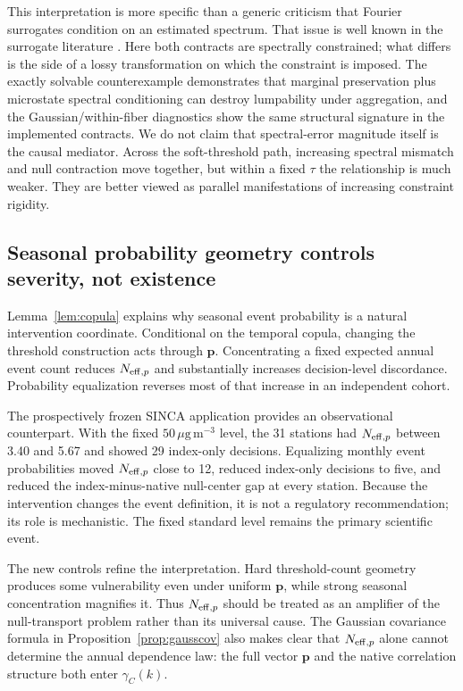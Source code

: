 This interpretation is more specific than a generic criticism that Fourier surrogates condition on an estimated spectrum. That issue is well known in the surrogate literature \cite{SchreiberSchmitz2000,Kugiumtzis1999}. Here both contracts are spectrally constrained; what differs is the side of a lossy transformation on which the constraint is imposed. The exactly solvable counterexample demonstrates that marginal preservation plus microstate spectral conditioning can destroy lumpability under aggregation, and the Gaussian/within-fiber diagnostics show the same structural signature in the implemented contracts. We do not claim that spectral-error magnitude itself is the causal mediator. Across the soft-threshold path, increasing spectral mismatch and null contraction move together, but within a fixed $\tau$ the relationship is much weaker. They are better viewed as parallel manifestations of increasing constraint rigidity.

\subsection{Seasonal probability geometry controls severity, not existence}\label{sec:discussionseason}

Lemma~\ref{lem:copula} explains why seasonal event probability is a natural intervention coordinate. Conditional on the temporal copula, changing the threshold construction acts through $\mathbf p$. Concentrating a fixed expected annual event count reduces $N_{\mathrm{eff},p}$ and substantially increases decision-level discordance. Probability equalization reverses most of that increase in an independent cohort.

The prospectively frozen SINCA application provides an observational counterpart. With the fixed $50\,\mu\mathrm{g\,m^{-3}}$ level, the 31 stations had $N_{\mathrm{eff},p}$ between 3.40 and 5.67 and showed 29 index-only decisions. Equalizing monthly event probabilities moved $N_{\mathrm{eff},p}$ close to 12, reduced index-only decisions to five, and reduced the index-minus-native null-center gap at every station. Because the intervention changes the event definition, it is not a regulatory recommendation; its role is mechanistic. The fixed standard level remains the primary scientific event.

The new controls refine the interpretation. Hard threshold-count geometry produces some vulnerability even under uniform $\mathbf p$, while strong seasonal concentration magnifies it. Thus $N_{\mathrm{eff},p}$ should be treated as an amplifier of the null-transport problem rather than its universal cause. The Gaussian covariance formula in Proposition~\ref{prop:gausscov} also makes clear that $N_{\mathrm{eff},p}$ alone cannot determine the annual dependence law: the full vector $\mathbf p$ and the native correlation structure both enter $\gamma_C(k)$.

